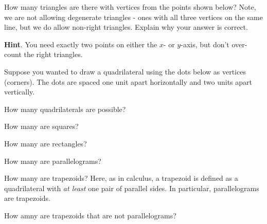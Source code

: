 \documentclass[11pt,]{book}
\theoremstyle{ptxplainnotitle}
\theoremstyle{ptxplaintitle}
\theoremstyle{ptxdefinitionnotitle}
\theoremstyle{ptxdefinitiontitle}
\theoremstyle{ptxdefinitionnotitle}
\theoremstyle{ptxdefinitiontitle}
\theoremstyle{ptxdefinitionnotitle}
\theoremstyle{ptxdefinitiontitle}
\theoremstyle{ptxdefinitiontitlenonumber}
\theoremstyle{ptxdefinitiontitlenonumber}
\numberwithin{equation}{chapter}
\begin{document}
\begin{divisionexercise}{4}\hypertarget{exercise-137}{}
\hypertarget{p-1503}{}%
How many triangles are there with vertices from the points shown below? Note, we are not allowing degenerate triangles - ones with all three vertices on the same line, but we do allow non-right triangles. Explain why your answer is correct.%
\begin{sidebyside}{1}{0.25}{0.25}{0}
\begin{sbspanel}{0.5}
\end{sbspanel}
\end{sidebyside}
\par\smallskip%
\noindent\textbf{Hint}.\hypertarget{hint-12}{}\quad%
\hypertarget{p-1504}{}%
You need exactly two points on either the \(x\)- or \(y\)-axis, but don't over-count the right triangles.%
\end{divisionexercise}%
\begin{divisionexercise}{5}\hypertarget{exercise-138}{}
\hypertarget{p-1505}{}%
Suppose you wanted to draw a quadrilateral using the dots below as vertices (corners).  The dots are spaced one unit apart horizontally and two units apart vertically.%
\begin{sidebyside}{1}{0.23}{0.23}{0}
\begin{sbspanel}{0.54}
\end{sbspanel}
\end{sidebyside}
\par\medskip
\hypertarget{p-1523}{}%
How many quadrilaterals are possible?%
\par
\hypertarget{p-1525}{}%
How many are squares?%
\par
\hypertarget{p-1527}{}%
How many are rectangles?%
\par
\hypertarget{p-1529}{}%
How many are parallelograms?%
\par
\hypertarget{p-1531}{}%
How many are trapezoids?  Here, as in calculus, a trapezoid is defined as a quadrilateral with \emph{at least} one pair of parallel sides. In particular, parallelograms are trapezoids.%
\par
\hypertarget{p-1533}{}%
How amny are trapezoids that are not parallelograms?%
\end{divisionexercise}%
\end{document}

